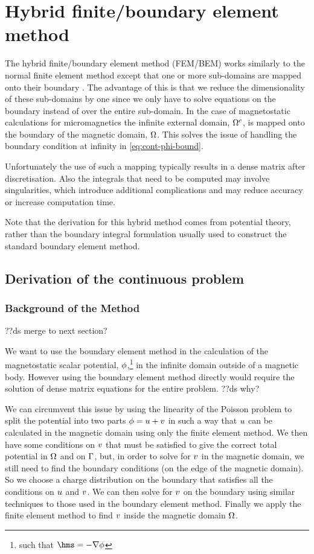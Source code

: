 \newcommand{\bmop}{\mathcal{G}}

\chapter{Hybrid finite/boundary element method}
\label{sec:hybr-finit-elem}
The hybrid finite/boundary element method (FEM/BEM) works similarly to the normal finite element method except that one or more sub-domains are mapped onto their boundary \cite{Rammohan2002}.
The advantage of this is that we reduce the dimensionality of these sub-domains by one since we only have to solve equations on the boundary instead of over the entire sub-domain.
In the case of magnetostatic calculations for micromagnetics the infinite external domain, ${\Omega^c}$, is mapped onto the boundary of the magnetic domain, $\Omega$.
This solves the issue of handling the boundary condition at infinity in \cref{eq:cont-phi-bound}.

Unfortunately the use of such a mapping typically results in a dense matrix after discretisation.
Also the integrals that need to be computed may involve singularities, which introduce additional complications and may reduce accuracy or increase computation time.

Note that the derivation for this hybrid method comes from potential theory, rather than the boundary integral formulation usually used to construct the standard boundary element method.

\section{Derivation of the continuous problem}
\label{sec:bem-derivation}

\subsection{Background of the Method}
\label{sec:basic-method}
??ds merge to next section?

We want to use the boundary element method in the calculation of the magnetostatic scalar potential, $\phi$,\footnote{such that $\hms = - \grad \phim$} in the infinite domain outside of a magnetic body.
However using the boundary element method directly would require the solution of dense matrix equations for the entire problem. ??ds why?

We can circumvent this issue by using the linearity of the Poisson problem to split the potential into two parts $\phi = u + v$ in such a way that $u$ can be calculated in the magnetic domain using only the finite element method.
We then have some conditions on $v$ that must be satisfied to give the correct total potential in $\Omega$ and on ${\Gamma}$, but, in order to solve for $v$ in the magnetic domain, we still need to find the boundary conditions (on the edge of the magnetic domain).
So we choose a charge distribution on the boundary that satisfies all the conditions on $u$ and $v$.
We can then solve for $v$ on the boundary using similar techniques to those used in the boundary element method.
Finally we apply the finite element method to find $v$ inside the magnetic domain $\Omega$.


